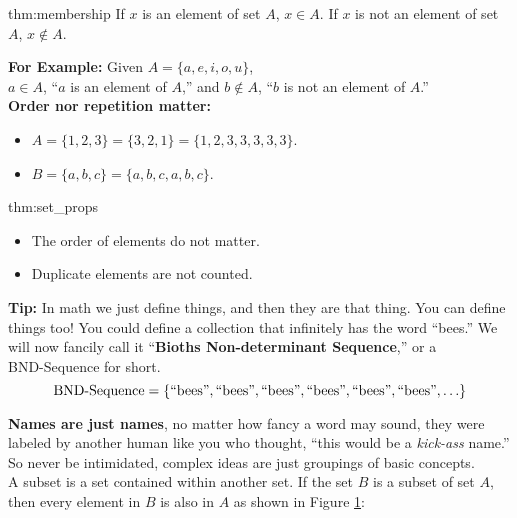 \begin{theo}[Membership]{thm:membership}
    If $x$ is an element of set $A$, $x \in A$.
    If $x$ is not an element of set $A$, $x \notin A$.
\end{theo}

\noindent
\textbf{For Example:} Given $A = \{a, e, i, o, u\}$,\\
$a \in A$, ``$a$ is an element of $A$,'' and
$b \notin A$, ``$b$ is not an element of $A$.''\\

\noindent
\textbf{Order nor repetition matter:}
\begin{itemize}
    \item $A = \{1, 2, 3\} = \{3, 2, 1\} = \{1, 2, 3, 3, 3, 3, 3\}$.
    \item $B = \{a, b, c\} = \{a, b, c, a, b, c\}$.
\end{itemize}

\begin{theo}{thm:set_props}
    \begin{itemize}
        \item The order of elements do not matter.
        \item Duplicate elements are not counted.
    \end{itemize}
\end{theo}

\noindent
\textbf{Tip:} In math we just define things, and then they are that thing. You can define things too!
You could define a collection that infinitely has the word ``bees.'' We
will now fancily call it ``\textbf{Bioths Non-determinant Sequence},'' or a\\
BND-Sequence for short.\\
$$\textnormal{BND-Sequence} = \{\textnormal{``bees''}, \textnormal{``bees''}, \textnormal{``bees''}, \textnormal{``bees''},
    \textnormal{``bees''}, \textnormal{``bees''}, \ldots\}$$

\noindent
\textbf{Names are just names}, no matter how fancy a word may sound, they were labeled
by another human like you who thought, ``this would be a \textit{kick-ass} name.'' So never be intimidated,
complex ideas are just groupings of basic concepts.\\

\newpage
A subset is a set contained within another set. If the set $B$ is a subset of set $A$,
then every element in $B$ is also in $A$ as shown in Figure \ref{fig:subset}:


\begin{figure}[ht]
    \centering
    \caption{}
    \label{fig:subset}
\end{figure}


